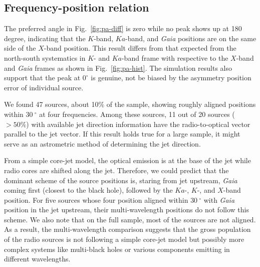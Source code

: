 \documentclass{aa}
\begin{document}




\subsection{Frequency-position relation} \label{subsec:freq-pos}

    The preferred angle in Fig.~\ref{fig:pa-diff} is zero while no peak shows up at 180 degree, indicating that the $K$-band, $Ka$-band, and \textit{Gaia} positions are on the same side of the $X$-band position.
    This result differs from that expected from the north-south systematics in $K$- and $Ka$-band frame with respective to the $X$-band and \textit{Gaia} frames as shown in Fig.~\ref{fig:pa-hist}.
    The simulation results also support that the peak at $0^{\circ}$ is genuine, not be biased by the asymmetry position error of individual source.

    We found 47 sources, about 10\% of the sample, showing roughly aligned positions within $30~^\circ$ at four frequencies.
    Among these sources, 11 out of 20 sources ($>50\%$) with available jet direction information have the radio-to-optical vector parallel to the jet vector.
    If this result holds true for a large sample, it might serve as an astrometric method of determining the jet direction.

    From a simple core-jet model, the optical emission is at the base of the jet while radio cores are shifted along the jet.
    Therefore, we could predict that the dominant scheme of the source positions is, staring from jet upstream, \textit{Gaia} coming first (closest to the black hole), followed by the $Ka$-, $K$-, and $X$-band position.
    For five sources whose four position aligned within $30~^\circ$ with \textit{Gaia} position in the jet upstream, their multi-wavelength positions do not follow this scheme.
    We also note that on the full sample, most of the sources are not aligned.
    As a result, the multi-wavelength comparison suggests that the gross population of the radio sources is not following a simple core-jet model but possibly more complex systems like multi-black holes or various components emitting in different wavelengths.
\end{document}
